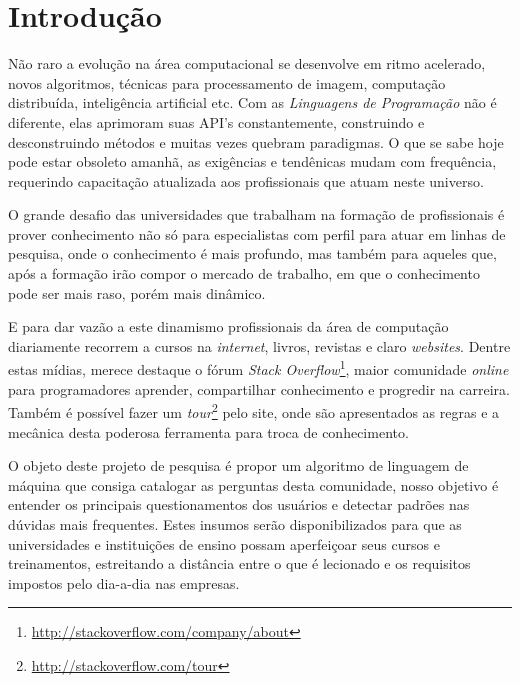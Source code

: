 \documentclass[
	12pt,				%
	openright,		%
	twoside,			%
	a4paper,			%
	english,				%
	french,				%
	spanish,			%
	brazil,				%
	]{abntex2}
\begin{document}
\chapter*[Introdução]{Introdução}

Não raro a evolução na área computacional se desenvolve em ritmo acelerado, novos algoritmos, técnicas para processamento de imagem, computação distribuída, inteligência artificial etc. Com as \emph{Linguagens de Programação} não é diferente, elas aprimoram suas API's constantemente, construindo e desconstruindo métodos e muitas vezes quebram paradigmas. O que se sabe hoje pode estar obsoleto amanhã, as exigências e tendênicas mudam com frequência, requerindo capacitação atualizada aos profissionais que atuam neste universo.  

O grande desafio das universidades que trabalham na formação de profissionais é prover conhecimento não só para especialistas com perfil para atuar em linhas de pesquisa, onde o conhecimento é mais profundo, mas também para aqueles que, após a formação irão compor o mercado de trabalho, em que o conhecimento pode ser mais raso, porém mais dinâmico.

E para dar vazão a este dinamismo profissionais da área de computação diariamente recorrem a cursos na \textit{internet}, livros, revistas e claro \textit{websites}. Dentre estas mídias, merece destaque o fórum \textit{Stack Overflow}\footnote{\url{http://stackoverflow.com/company/about}}, maior comunidade \textit{online} para programadores aprender, compartilhar conhecimento e progredir na carreira. Também é possível fazer um \textit{tour}\footnote{\url{http://stackoverflow.com/tour}} pelo site, onde são apresentados as regras e a mecânica desta poderosa ferramenta para troca de conhecimento.

O objeto deste projeto de pesquisa é propor um algoritmo de linguagem de máquina que consiga catalogar as perguntas desta comunidade, nosso objetivo é entender os principais questionamentos dos usuários e detectar padrões nas dúvidas mais frequentes. Estes insumos serão disponibilizados para que as universidades e instituições de ensino possam aperfeiçoar seus cursos e treinamentos, estreitando a distância entre o que é lecionado e os requisitos impostos pelo dia-a-dia nas empresas.

\end{document}

